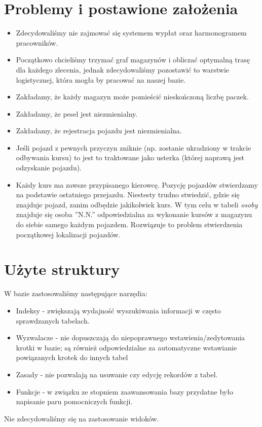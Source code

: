 \documentclass{article} %
\begin{document}
\section*{Problemy i postawione założenia}
	\begin{itemize}
	\item Zdecydowaliśmy nie zajmować się systemem wypłat oraz harmonogramem pracowników.
	\item Początkowo chcieliśmy trzymać graf magazynów i obliczać optymalną trasę dla każdego zlecenia, jednak zdecydowaliśmy pozostawić to warstwie logistycznej, która mogła by pracować na naszej bazie.				
    \item Zakładamy, że każdy magazyn może pomieścić nieskończoną liczbę paczek.
    \item Zakładamy, że pesel jest niezmienialny.
	\item Zakładamy, że rejestracja pojazdu jest niezmienialna.
	\item Jeśli pojazd z pewnych przyczyn zniknie (np. zostanie ukradziony w trakcie odbywania kursu) to jest to traktowane jako usterka (której naprawą jest odzyskanie pojazdu). 
	\item Każdy kurs ma zawsze przypisanego kierowcę. Pozycję pojazdów stwierdzamy na podstawie ostatniego przejazdu. Niestesty trudno stwiedzić, gdzie się znajduje pojazd, zanim odbędzie jakikolwiek kurs. W tym celu w tabeli \textit{osoby} znajduje się osoba ''N.N.'' odpowiedzialna za wykonanie kursów z magazynu do siebie samego każdym pojazdem. Rozwiązuje to problem stwierdzenia początkowej lokalizacji pojazdów.
	\end{itemize}
\section*{Użyte struktury}
	W bazie zastosowaliśmy następujące narzędia:
	\begin{itemize}
	\item Indeksy - zwiększają wydajność wyszukiwania informacji w często sprawdzanych tabelach.
	\item Wyzwalacze - nie dopuszczają do niepoprawnego wstawienia/zedytowania krotki w bazie; są również odpowiedzialne za automatyczne wstawianie powiązanych krotek do innych tabel
	\item Zasady - nie pozwalają na usuwanie czy edycję rekordów z tabel.
	\item Funkcje - w związku ze stopniem zaawansowania bazy przydatne było napisanie paru pomocniczych funkcji.
	\end{itemize}
	Nie zdecydowaliśmy się na zastosowanie widoków.
\end{document}
